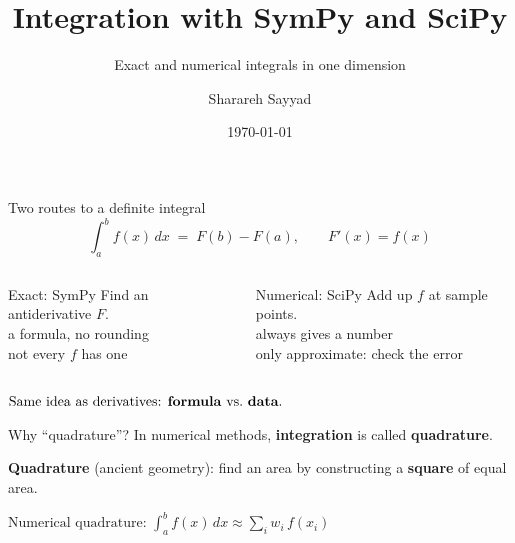 \documentclass[aspectratio=169]{beamer}
\title{Integration with SymPy and SciPy}
\subtitle{Exact and numerical integrals in one dimension}
\author{Sharareh Sayyad}
\institute{Washington State University}
\date{\today}
\newcommand{\cbox}[2]{\colorbox{#1}{\ensuremath{\displaystyle #2}}}
\begin{document}
\frame{\titlepage}

\begin{frame}{Two routes to a definite integral}
\[ \int_a^b f(x)\,dx \;=\; F(b) - F(a), \qquad F'(x) = f(x) \]

\vspace{0.2em}
\begin{columns}[T]
\begin{column}{0.48\textwidth}
\begin{block}{Exact: SymPy}
\small
Find an antiderivative $F$.\\[2pt]
\footnotesize
\textcolor{gr}{} a formula, no rounding\\
\textcolor{hl}{} not every $f$ has one
\end{block}
\end{column}
\begin{column}{0.48\textwidth}
\begin{block}{Numerical: SciPy}
\small
Add up $f$ at sample points.\\[2pt]
\footnotesize
\textcolor{gr}{} always gives a number\\
\textcolor{hl}{} only approximate: check the error
\end{block}
\end{column}
\end{columns}

\vspace{0.8em}
\centering
\cbox{accent!12}{\text{Same idea as derivatives: \textbf{formula} vs.\ \textbf{data}.}}
\end{frame}

\begin{frame}{Why ``quadrature''?}
\centering
In numerical methods, \textbf{integration} is called \textbf{quadrature}.

\vspace{1.2em}

\vspace{0.8em}
\textbf{Quadrature} (ancient geometry): find an area by constructing a \textbf{square} of equal area.

\vspace{1.2em}
\cbox{accent!12}{\text{Numerical quadrature: } \int_a^b f(x)\,dx \approx \textstyle\sum_i w_i\, f(x_i)}
\end{frame}
\end{document}
